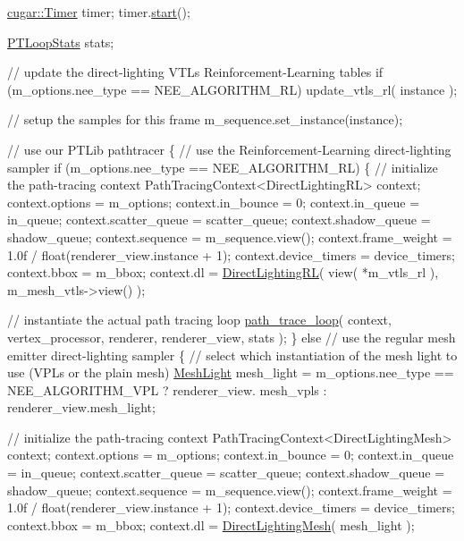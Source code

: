 \begin{DoxyCodeInclude}
{{{{{{{{{{{{{{{{{    \hyperlink{structcugar_1_1_timer}{cugar::Timer} timer;
    timer.\hyperlink{structcugar_1_1_timer_a337264814110dc99fd8b78b1267589d7}{start}();

    \hyperlink{struct_p_t_loop_stats}{PTLoopStats} stats;

    \textcolor{comment}{// update the direct-lighting VTLs Reinforcement-Learning tables}
    \textcolor{keywordflow}{if} (m\_options.nee\_type == NEE\_ALGORITHM\_RL)
        update\_vtls\_rl( instance );

    \textcolor{comment}{// setup the samples for this frame}
    m\_sequence.set\_instance(instance);

    \textcolor{comment}{// use our PTLib pathtracer}
    \{
        \textcolor{comment}{// use the Reinforcement-Learning direct-lighting sampler}
        \textcolor{keywordflow}{if} (m\_options.nee\_type == NEE\_ALGORITHM\_RL)
        \{
            \textcolor{comment}{// initialize the path-tracing context}
            PathTracingContext<DirectLightingRL> context;
            context.options         = m\_options;
            context.in\_bounce       = 0;
            context.in\_queue        = in\_queue;
            context.scatter\_queue   = scatter\_queue;
            context.shadow\_queue    = shadow\_queue;
            context.sequence        = m\_sequence.view();
            context.frame\_weight    = 1.0f / float(renderer\_view.instance + 1);
            context.device\_timers   = device\_timers;
            context.bbox            = m\_bbox;
            context.dl              = \hyperlink{struct_direct_lighting_r_l}{DirectLightingRL}(
                view( *m\_vtls\_rl ),
                m\_mesh\_vtls->view() );

            \textcolor{comment}{// instantiate the actual path tracing loop}
            \hyperlink{group___p_t_lib_gadbd6e824e2ecdd07fae235bddebcd1d8}{path\_trace\_loop}( context, vertex\_processor, renderer, renderer\_view, stats );
        \}
        \textcolor{keywordflow}{else} \textcolor{comment}{// use the regular mesh emitter direct-lighting sampler}
        \{
            \textcolor{comment}{// select which instantiation of the mesh light to use (VPLs or the plain mesh)}
            \hyperlink{struct_mesh_light}{MeshLight} mesh\_light = m\_options.nee\_type == NEE\_ALGORITHM\_VPL ? renderer\_view.
      mesh\_vpls : renderer\_view.mesh\_light;

            \textcolor{comment}{// initialize the path-tracing context}
            PathTracingContext<DirectLightingMesh> context;
            context.options         = m\_options;
            context.in\_bounce       = 0;
            context.in\_queue        = in\_queue;
            context.scatter\_queue   = scatter\_queue;
            context.shadow\_queue    = shadow\_queue;
            context.sequence        = m\_sequence.view();
            context.frame\_weight    = 1.0f / float(renderer\_view.instance + 1);
            context.device\_timers   = device\_timers;
            context.bbox            = m\_bbox;
            context.dl              = \hyperlink{struct_direct_lighting_mesh}{DirectLightingMesh}( mesh\_light );

}}}}}}}}}}}}}}}}}
\end{DoxyCodeInclude}
